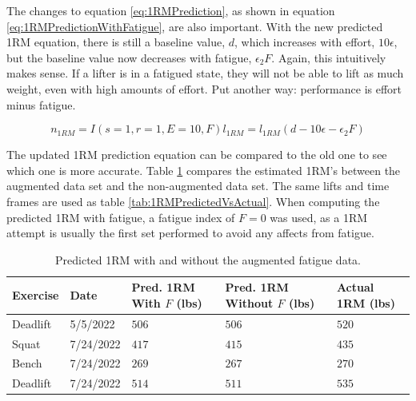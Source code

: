 
The changes to equation \ref{eq:1RMPrediction}, as shown in equation \ref{eq:1RMPredictionWithFatigue}, are also important. With the new predicted 1RM equation, there is still a baseline value, $d$, which increases with effort, $10\epsilon$, but the baseline value now decreases with fatigue, $\epsilon_2 F$. Again, this intuitively makes sense. If a lifter is in a fatigued state, they will not be able to lift as much weight, even with high amounts of effort. Put another way: performance is effort minus fatigue.
 
\begin{equation}
    \label{eq:1RMPredictionWithFatigue}
    n_{1RM}=I(s=1,r=1,E=10,F)l_{1RM}=l_{1RM}( d-10\epsilon-\epsilon_2 F)
\end{equation}

The updated 1RM prediction equation can be compared to the old one to see which one is more accurate. Table \ref{tab:Predicted1RMWithAndWithoutFatigue} compares the estimated 1RM's between the augmented data set and the non-augmented data set. The same lifts and time frames are used as table \ref{tab:1RMPredictedVsActual}. When computing the predicted 1RM with fatigue, a fatigue index of $F=0$ was used, as a 1RM attempt is usually the first set performed to avoid any affects from fatigue.

\begin{table}[h]
    \centering
    \begin{tabular}{p{2cm}|p{2cm}|p{3cm}|p{3cm}|p{3cm}}
        Exercise &  Date & Pred. 1RM With $F$  (lbs) & Pred. 1RM Without $F$ (lbs) & Actual 1RM (lbs) \\
        \hline
        Deadlift & 5/5/2022 & $506$ & $506$ & $520$ \\
        Squat & 7/24/2022 & $417$ & $415$ & $435$ \\
        Bench & 7/24/2022 & $269$ & $267$ & $270$ \\
        Deadlift & 7/24/2022 & $514$ & $511$ & $535$ \\
    \end{tabular}
    \caption{Predicted 1RM with and without the augmented fatigue data.}
    \label{tab:Predicted1RMWithAndWithoutFatigue}
\end{table}

